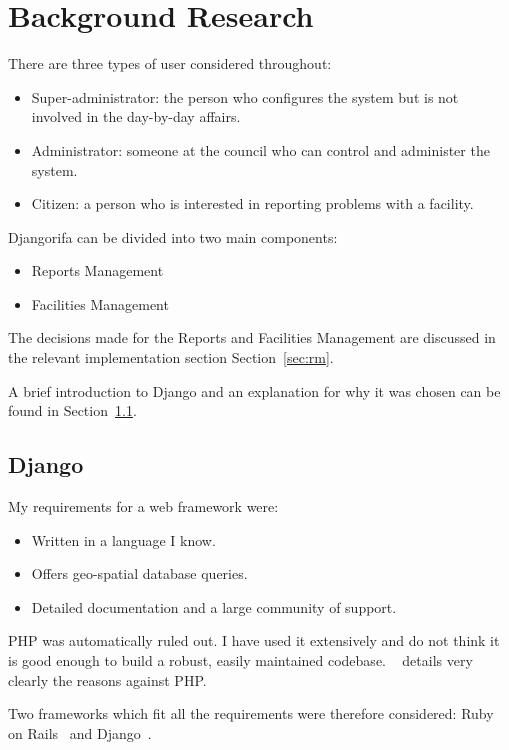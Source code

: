 \chapter{Background Research}
\label{sec:br}

There are three types of user considered throughout:
\begin{itemize}
\item Super-administrator: the person who configures the system but is not involved in the day-by-day affairs.
\item Administrator: someone at the council who can control and administer the system.
\item Citizen: a person who is interested in reporting problems with a facility.
\end{itemize}

Djangorifa can be divided into two main components:
\begin{itemize}
\item Reports Management
\item Facilities Management
\end{itemize}

The decisions made for the Reports and Facilities Management are discussed in the relevant implementation section Section~\ref{sec:rm}.

A brief introduction to Django and an explanation for why it was chosen can be found in Section~\ref{br:django}.

\section{Django}
\label{br:django}

My requirements for a web framework were:
\begin{itemize}
\item Written in a language I know.
\item Offers geo-spatial database queries.
\item Detailed documentation and a large community of support.
\end{itemize}

PHP was automatically ruled out. I have used it extensively and do not think it is good enough to build a robust, easily maintained codebase. ~\cite{phpsucks} details very clearly the reasons against PHP.

Two frameworks which fit all the requirements were therefore considered: Ruby on Rails~\cite{rails} and Django~\cite{django}.

